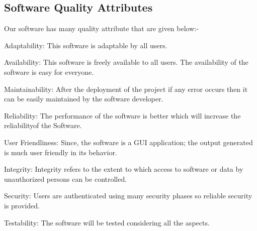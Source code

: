 \documentclass[oneside,a4paper,12pt]{report}
\begin{document}
\subsection {Software Quality Attributes}
\item  Our software has many quality attribute that are given below:-\\
\item Adaptability: This software is adaptable by all users.\\
\item Availability: This software is freely available to all users. The availability of the software is easy for everyone.\\
\item Maintainability: After the deployment of the project if any error occurs then it can be easily maintained by the software developer.\\
\item Reliability: The performance of the software is better which will increase the reliabilityof the Software.\\
\item User Friendliness: Since, the software is a GUI application; the output generated is much user friendly in its behavior.\\
\item Integrity: Integrity refers to the extent to which access to software or data by unauthorized persons can be controlled.\\
\item Security: Users are authenticated using many security phases so reliable security is provided.\\
\item Testability: The software will be tested considering all the aspects.\\
\end{document}
